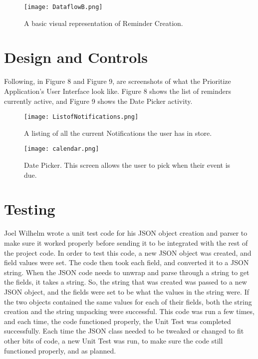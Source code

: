 \documentclass[12pt]{article}
\begin{document}
\begin{figure}[h]
\texttt{[image: DataflowB.png]}
\centering
\caption{A basic visual representation of Reminder Creation.}
\end{figure}


\section{Design and Controls}

Following, in Figure 8 and Figure 9, are screenshots of what the Prioritize Application's User Interface look like. Figure 8 shows the list of reminders currently active, and Figure 9 shows the Date Picker activity.

\begin{figure}[h]
\texttt{[image: ListofNotifications.png]}
\centering
\caption{A listing of all the current Notifications the user has in store.}
\end{figure}


\begin{figure}[h]
\texttt{[image: calendar.png]}
\centering
\caption{Date Picker. This screen allows the user to pick when their event is due.}
\end{figure}



\section{Testing}

Joel Wilhelm wrote a unit test code for his JSON object creation and parser to make sure it worked properly before sending it to be integrated with the rest of the project code. In order to test this code, a new JSON object was created, and field values were set. The code then took each field, and converted it to a JSON string. When the JSON code needs to unwrap and parse through a string to get the fields, it takes a string. So, the string that was created was passed to a new JSON object, and the fields were set to be what the values in the string were. If the two objects contained the same values for each of their fields, both the string creation and the string unpacking were successful. This code was run a few times, and each time, the code functioned properly, the Unit Test was completed successfully. Each time the JSON class needed to be tweaked or changed to fit other bits of code, a new Unit Test was run, to make sure the code still functioned properly, and as planned.
\end{document}
